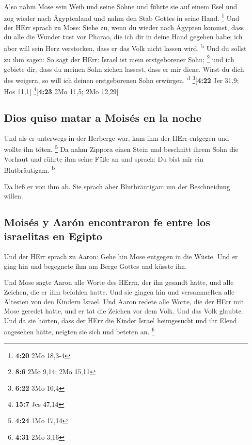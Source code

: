  Also nahm Mose sein Weib und seine Söhne und führte sie
auf einem Esel und zog wieder nach Ägyptenland und nahm den Stab Gottes
in seine Hand. \footnote{\textbf{4:20} 2Mo 18,3-4}  Und
der HErr sprach zu Mose: Siehe zu, wenn du wieder nach Ägypten kommst,
dass du alle die Wunder tust vor Pharao, die ich dir in deine Hand
gegeben habe; ich aber will sein Herz verstocken, dass er das Volk nicht
lassen wird. \textsuperscript{b}  Und du sollst zu ihm
sagen: So sagt der HErr: Israel ist mein erstgeborener Sohn; \footnote{\textbf{8:6}
  2Mo 9,14; 2Mo 15,11}  und ich gebiete dir, dass du
meinen Sohn ziehen lassest, dass er mir diene. Wirst du dich des
weigern, so will ich deinen erstgeborenen Sohn erwürgen.
\textsuperscript{d} \footnote{\textbf{6:22} 3Mo 10,4}{[}\textbf{4:22}
Jer 31,9; Hos 11,1{]} \footnote{\textbf{15:7} Jes 47,14}{[}\textbf{4:23}
2Mo 11,5; 2Mo 12,29{]}

\hypertarget{dios-quiso-matar-a-moisuxe9s-en-la-noche}{%
\subsection{Dios quiso matar a Moisés en la
noche}\label{dios-quiso-matar-a-moisuxe9s-en-la-noche}}

 Und als er unterwegs in der Herberge war, kam ihm der
HErr entgegen und wollte ihn töten. \footnote{\textbf{4:24} 1Mo 17,14}
 Da nahm Zippora einen Stein und beschnitt ihrem Sohn die
Vorhaut und rührte ihm seine Füße an und sprach: Du bist mir ein
Blutbräutigam. \textsuperscript{b}

 Da ließ er von ihm ab. Sie sprach aber Blutbräutigam um
der Beschneidung willen.

\hypertarget{moisuxe9s-y-aaruxf3n-encontraron-fe-entre-los-israelitas-en-egipto}{%
\subsection{Moisés y Aarón encontraron fe entre los israelitas en
Egipto}\label{moisuxe9s-y-aaruxf3n-encontraron-fe-entre-los-israelitas-en-egipto}}

 Und der HErr sprach zu Aaron: Gehe hin Mose entgegen in
die Wüste. Und er ging hin und begegnete ihm am Berge Gottes und küsste
ihn.

 Und Mose sagte Aaron alle Worte des HErrn, der ihn
gesandt hatte, und alle Zeichen, die er ihm befohlen hatte.
 Und sie gingen hin und versammelten alle Ältesten von
den Kindern Israel.  Und Aaron redete alle Worte, die der
HErr mit Mose geredet hatte, und er tat die Zeichen vor dem Volk.
 Und das Volk glaubte. Und da sie hörten, dass der HErr
die Kinder Israel heimgesucht und ihr Elend angesehen hätte, neigten sie
sich und beteten an. \footnote{\textbf{4:31} 2Mo 3,16}

